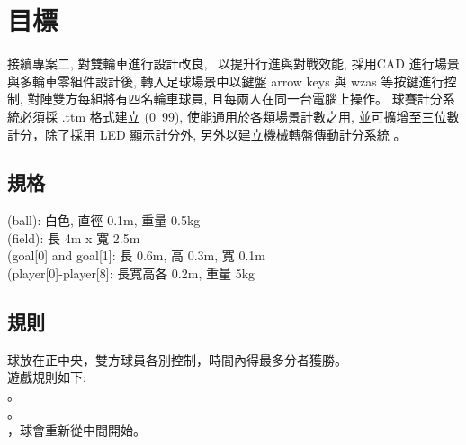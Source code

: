 \chapter{目標}
接續專案二, 對雙輪車進行設計改良,  以提升行進與對戰效能, 採用CAD 進行場景與多輪車零組件設計後, 轉入足球場景中以鍵盤 arrow keys 與 wzas 等按鍵進行控制, 對陣雙方每組將有四名輪車球員, 且每兩人在同一台電腦上操作。
球賽計分系統必須採 .ttm 格式建立 (0~99), 使能通用於各類場景計數之用, 並可擴增至三位數計分，除了採用 LED 顯示計分外, 另外以建立機械轉盤傳動計分系統 。

\section{規格}
 (ball): 白色, 直徑 0.1m, 重量 0.5kg \\
 (field): 長 4m x 寬 2.5m \\
 (goal[0] and goal[1]: 長 0.6m, 高 0.3m, 寬 0.1m \\
 (player[0]-player[8]: 長寬高各 0.2m, 重量 5kg \\

\section{規則}
球放在正中央，雙方球員各別控制，時間內得最多分者獲勝。 \\
遊戲規則如下: \\
。 \\
。 \\
，球會重新從中間開始。 \\
